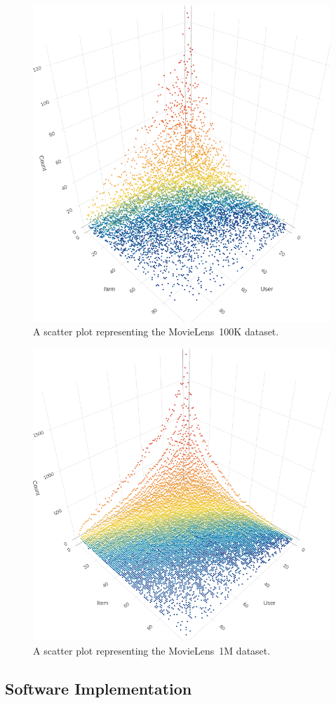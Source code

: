 \begin{figure}
\centering
\includegraphics[width=.75\textwidth]{ml-100k}
\caption[Scatter plot of MovieLens~100K]{A scatter plot representing the MovieLens~100K dataset.}
\label{viz:fig:ml-100k}
\end{figure}

\begin{figure}
\centering
\includegraphics[width=.75\textwidth]{ml-1m}
\caption[Scatter plot of MovieLens~1M]{A scatter plot representing the MovieLens~1M dataset.}
\label{viz:fig:ml-1m}
\end{figure}

\subsection{Software Implementation}
\label{viz:sec:implementation}

